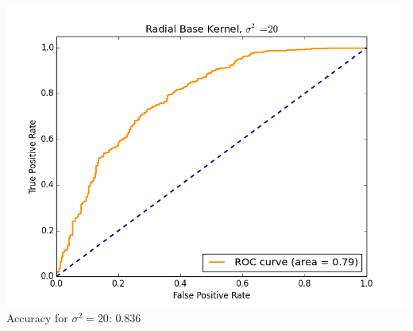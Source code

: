 \documentclass[11pt]{article}
\begin{document}
\begin{enumerate}
\begin{itemize}
\includegraphics[scale=.75]{radial20.png}\\

Accuracy for $\sigma^2=20$: 0.836

\end{itemize}
\end{enumerate}



 
\end{document}
